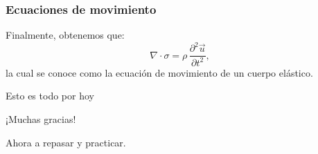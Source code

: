 \documentclass[11pt,handout,aspectratio=1610]{beamer}
\newcommand{\pddiff}[2]{\frac{\partial^2 #1}{\partial #2^2}}
\newcommand{\vs}{\vspace{11pt}}
\begin{document}
\begin{frame}
    \frametitle{Ecuaciones de movimiento}
    
    Finalmente, obtenemos que: $$ \nabla \cdot \sigma = \rho \, \pddiff{\vec{u}}{t},$$ la cual se conoce como la ecuación de movimiento de un cuerpo elástico.
    
\end{frame}

\begin{frame}{Esto es todo por hoy}

    \begin{center}
        {\huge ¡Muchas gracias!}

        \vs

        Ahora a repasar y practicar.
    \end{center}

\end{frame}
\end{document}
